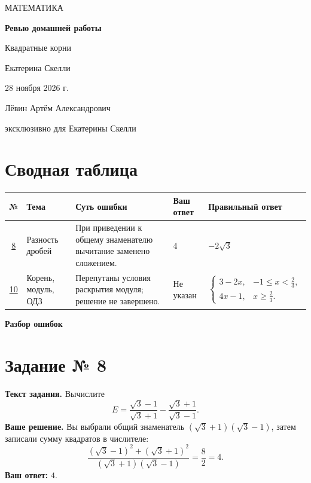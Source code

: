 \documentclass[a4paper,11pt]{article}
\newcommand{\taskhead}[1]{\phantomsection\label{task:#1}\section*{\textcolor{accent}{Задание № #1}}}
\begin{document}
\begin{titlepage}
\centering
\vspace*{22mm}
{\large МАТЕМАТИКА\par}
\vspace{24mm}
{\LARGE\bfseries Ревью домашней работы\par}
\vspace{7mm}
{\Large Квадратные корни\par}
\vspace{18mm}
{\large Екатерина Скелли\par}
\vspace{5mm}
28 ноября 2026 г.\par
\vfill
Лёвин Артём Александрович\par
эксклюзивно для Екатерины Скелли\par
\vspace{10mm}
\end{titlepage}
\setcounter{page}{1}
\section*{\textcolor{accent}{Сводная таблица}}
\small
\renewcommand{\arraystretch}{1.45}
\begin{tabularx}{\linewidth}{@{}c p{25mm} X p{23mm} p{39mm}@{}}
\toprule
№ & Тема & Суть ошибки & Ваш ответ & Правильный ответ\\
\midrule
\hyperref[task:8]{8} & Разность дробей & При приведении к общему знаменателю вычитание заменено сложением. & $4$ & $-2\sqrt3$\\
\hyperref[task:10]{10} & Корень, модуль, ОДЗ & Перепутаны условия раскрытия модуля; решение не завершено. & Не указан & $\begin{cases}3-2x,&-1\le x<\frac23,\\4x-1,&x\ge\frac23.\end{cases}$\\
\bottomrule
\end{tabularx}
\normalsize
\clearpage
\thispagestyle{empty}
\vspace*{\fill}
\begin{center}
{\LARGE\bfseries\textcolor{accent}{Разбор ошибок}}
\end{center}
\vspace*{\fill}
\clearpage
\taskhead{8}
\textbf{Текст задания.} Вычислите
\[
E=\frac{\sqrt3-1}{\sqrt3+1}-\frac{\sqrt3+1}{\sqrt3-1}.
\]
\textbf{Ваше решение.} Вы выбрали общий знаменатель $(\sqrt3+1)(\sqrt3-1)$, затем записали сумму квадратов в числителе:
\[
\frac{(\sqrt3-1)^2+(\sqrt3+1)^2}{(\sqrt3+1)(\sqrt3-1)}
=\frac{8}{2}=4.
\]
\textbf{Ваш ответ:} $4$.
\end{document}
